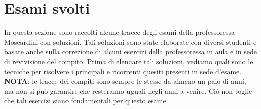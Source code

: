 \section{Esami svolti}
In questa sezione sono raccolti alcune tracce degli esami della professoressa
Moscardini con soluzioni. Tali soluzioni sono state elaborate con diversi studenti
e basate anche sulla correzione di alcuni esercizi della professoressa in aula e 
in sede di revivisione del compito. Prima di elencare tali soluzioni, vediamo quali
sono le tecniche per risolvere i principali e ricorrenti quesiti presenti in sede d'esame.\\
\textbf{NOTA}: le tracce dei compiti sono sempre le stesse da almeno un paio di anni, ma non
si può garantire che resteranno uguali negli anni a venire. Ciò non toglie che tali esercizi 
siano fondamentali per questo esame.
